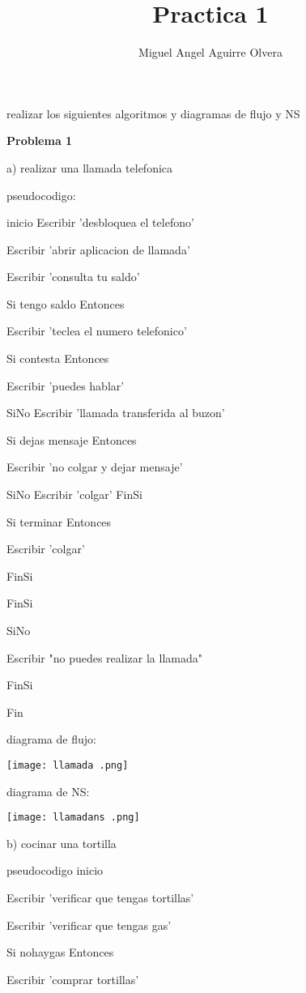 \documentclass[10pt,a4paper]{article}
\author{Miguel Angel Aguirre Olvera}
\title{Practica 1}
\begin{document}
\maketitle

\begin{multicols}{2}
realizar los siguientes algoritmos y diagramas de flujo y NS
\begin{center}
\textbf{Problema 1}  
\end{center}
a) realizar una llamada telefonica

pseudocodigo:

inicio
Escribir 'desbloquea el telefono'

	Escribir 'abrir aplicacion de llamada'
	
	Escribir 'consulta tu saldo'
	
	Si tengo saldo Entonces
	
		Escribir 'teclea el numero telefonico'
		
		Si contesta Entonces
		
			Escribir 'puedes hablar'
			
		SiNo
			Escribir 'llamada transferida al buzon'
			
			Si dejas mensaje Entonces
			
				Escribir 'no colgar y dejar mensaje'
				
			SiNo
				Escribir 'colgar'
			FinSi
			
			Si terminar Entonces
			
				Escribir 'colgar'

			FinSi

		FinSi

	SiNo

		Escribir "no puedes realizar la llamada"

	FinSi

Fin

diagrama de flujo:


\texttt{[image: llamada .png]} 

diagrama de NS:

\texttt{[image: llamadans .png]} 


b) cocinar una tortilla 

pseudocodigo 
inicio 

Escribir 'verificar que tengas tortillas'

	Escribir 'verificar que tengas gas'

	Si nohaygas Entonces

		Escribir 'comprar tortillas'


\end{multicols}
\end{document}
